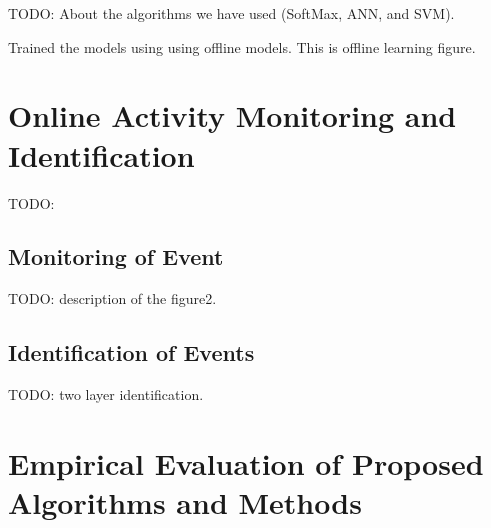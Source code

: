 \documentclass{IEEEtran}
\begin{document}
TODO: About the algorithms we have used (SoftMax, ANN, and SVM).

Trained the models using using offline models. This is offline learning figure. 

\section{Online Activity Monitoring and Identification}

TODO:

\subsection{Monitoring of Event}

TODO: description of the figure2.

\subsection{Identification of Events}

TODO: two layer identification. 

\section{Empirical Evaluation of Proposed Algorithms and Methods}
\label{Evaluation}

% 
%
\end{document}
